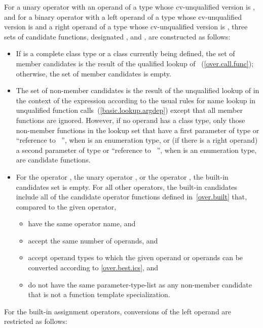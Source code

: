 \pnum
For a unary operator
with an operand of a type whose cv-unqualified version is
,
and for a binary operator
with a left operand of a type whose cv-unqualified version is
and a right operand of a type whose cv-unqualified version is
,
three sets of candidate functions, designated
,
and
,
are constructed as follows:
\begin{itemize}
\item
If
is a complete class type or a class currently being defined, the set of member candidates is the
result of the qualified lookup of
~(\ref{over.call.func}); otherwise, the set of member
candidates is empty.
\item
The set of non-member candidates is the result of the unqualified lookup of
in the context of
the expression according to the usual rules for name
lookup in unqualified function calls~(\ref{basic.lookup.argdep}) except
that all member functions are ignored.
However, if no operand has a class type, only those non-member
functions in the lookup set that have a first parameter of type
or ``reference to \cv{}~'',
when
is an enumeration type,
or (if there is a right operand) a second parameter of type
or ``reference to \cv{}~'',
when
is an enumeration type,
are candidate functions.
\item
For the operator
\tcode{,},
the unary operator
\tcode{\&},
or the operator
\tcode{->},
the built-in candidates set is empty.
For all other operators, the built-in candidates include all
of the candidate operator functions defined in~\ref{over.built} that,
compared to the given operator,

\begin{itemize}
\item
have the same operator name, and
\item
accept the same number of operands, and
\item
accept operand types to which the given operand or
operands can be converted according to \ref{over.best.ics}, and
\item
do not have the same parameter-type-list as any non-member candidate
that is not a function template specialization.
\end{itemize}
\end{itemize}

\pnum
For the built-in assignment operators, conversions of the left
operand are restricted as follows:

